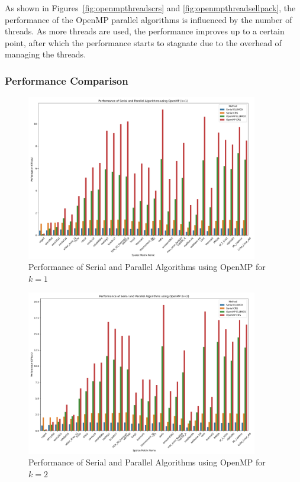 \documentclass[12pt,oneside]{book} %
\begin{document}
As shown in Figures~\ref{fig:openmpthreadscrs} and
\ref{fig:openmpthreadsellpack}, the performance of the OpenMP parallel
algorithms is influenced by the number of threads. As more threads are used,
the performance improves up to a certain point, after which the performance
starts to stagnate due to the overhead of managing the threads.

\subsubsection{Performance Comparison}
\begin{figure}[H]
    \centering
    \includegraphics[width=0.9\textwidth]{../results/images/openMP_Performance_k1.png}
    \caption{Performance of Serial and Parallel Algorithms using OpenMP for $k=1$}
    \label{fig:openmp-performance-k1}
\end{figure}

\begin{figure}[H]
    \centering
    \includegraphics[width=0.9\textwidth]{../results/images/openMP_Performance_k2.png}
    \caption{Performance of Serial and Parallel Algorithms using OpenMP for $k=2$}
    \label{fig:openmp-performance-k2}
\end{figure}
\end{document}
